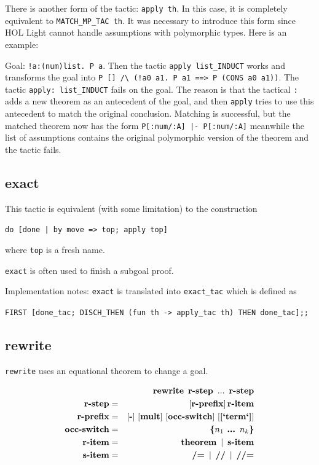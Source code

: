 \documentclass[a4paper]{article}
\newcommand{\xx}[1]{\mathop{\text{\bf #1}}}
\begin{document}
There is another form of the tactic: \verb|apply th|. In this case, it is completely equivalent to \verb|MATCH_MP_TAC th|. It was necessary to introduce this form since HOL Light cannot handle assumptions with polymorphic types. Here is an example:

Goal: \verb|!a:(num)list. P a|. Then the tactic \verb|apply list_INDUCT| works and transforms the goal into \verb|P [] /\ (!a0 a1. P a1 ==> P (CONS a0 a1))|. The tactic \verb|apply: list_INDUCT| fails on the goal. The reason is that the tactical \verb|:| adds a new theorem as an antecedent of the goal, and then \verb|apply| tries to use this antecedent to match the original conclusion. Matching is successful, but the matched theorem now has the form \verb$P[:num/:A] |- P[:num/:A]$ meanwhile the list of assumptions contains the original polymorphic version of the theorem and the tactic fails.


\subsection{exact}
This tactic is equivalent (with some limitation) to the construction 

\verb$do [done | by move => top; apply top]$ 

where \verb|top| is a fresh name.

\verb|exact| is often used to finish a subgoal proof.

Implementation notes: \verb|exact| is translated into \verb|exact_tac| which is defined as

\verb|FIRST [done_tac; DISCH_THEN (fun th -> apply_tac th) THEN done_tac];;|


\subsection{rewrite}
\verb|rewrite| uses an equational theorem to change a goal.

\begin{eqnarray*}
&&\xx{rewrite}\ \xx{r-step}\ ...\ \xx{r-step}\\
\xx{r-step} &=& [\xx{r-prefix}]\xx{r-item}\\
\xx{r-prefix} &=& [\xx{-}]\ [\xx{mult}]\ [\xx{occ-switch}]\ [\xx{[`term`]}]\\
\xx{occ-switch} &=& \xx{\{$n_1$ ... $n_k$\}}\\
\xx{r-item} &=& \xx{theorem}\ |\ \xx{s-item}\\
\xx{s-item} &=& \xx{/=}\ |\ \xx{//}\ |\ \xx{//=}
\end{eqnarray*}
\end{document}
